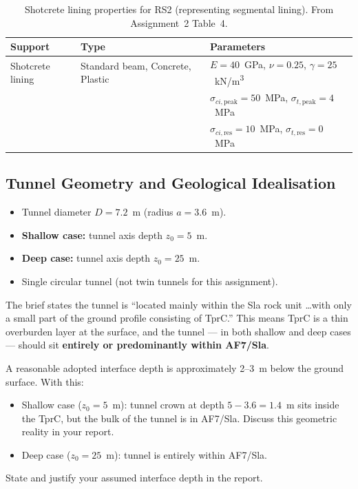 \documentclass[a4paper,12pt]{article}
\begin{document}
\begin{table}[h!]
\centering
\small
\begin{tabular}{l l l}
\toprule
\textbf{Support} & \textbf{Type} & \textbf{Parameters} \\
\midrule
Shotcrete lining & Standard beam, Concrete, Plastic & $E = 40$~GPa, $\nu = 0.25$, $\gamma = 25$~kN/m\textsuperscript{3} \\
 & & $\sigma_{ci,\text{peak}} = 50$~MPa, $\sigma_{t,\text{peak}} = 4$~MPa \\
 & & $\sigma_{ci,\text{res}} = 10$~MPa, $\sigma_{t,\text{res}} = 0$~MPa \\
\bottomrule
\end{tabular}
\caption{Shotcrete lining properties for RS2 (representing segmental lining). From Assignment~2 Table~4.}
\label{tab:lining}
\end{table}

\subsection{Tunnel Geometry and Geological Idealisation}
\begin{itemize}
    \item Tunnel diameter $D = 7.2$~m (radius $a = 3.6$~m).
    \item \textbf{Shallow case:} tunnel axis depth $z_0 = 5$~m.
    \item \textbf{Deep case:} tunnel axis depth $z_0 = 25$~m.
    \item Single circular tunnel (not twin tunnels for this assignment).
\end{itemize}

\begin{notebox}
The brief states the tunnel is ``located mainly within the Sla rock unit \dots with only a small part of the ground profile consisting of TprC.'' This means TprC is a thin overburden layer at the surface, and the tunnel --- in both shallow and deep cases --- should sit \textbf{entirely or predominantly within AF7/Sla}.
\vspace{0.5em}

A reasonable adopted interface depth is approximately 2--3~m below the ground surface. With this:
\begin{itemize}[nosep]
    \item Shallow case ($z_0 = 5$~m): tunnel crown at depth $5 - 3.6 = 1.4$~m sits inside the TprC, but the bulk of the tunnel is in AF7/Sla. Discuss this geometric reality in your report.
    \item Deep case ($z_0 = 25$~m): tunnel is entirely within AF7/Sla.
\end{itemize}
\vspace{0.5em}

State and justify your assumed interface depth in the report.
\end{notebox}
\end{document}
